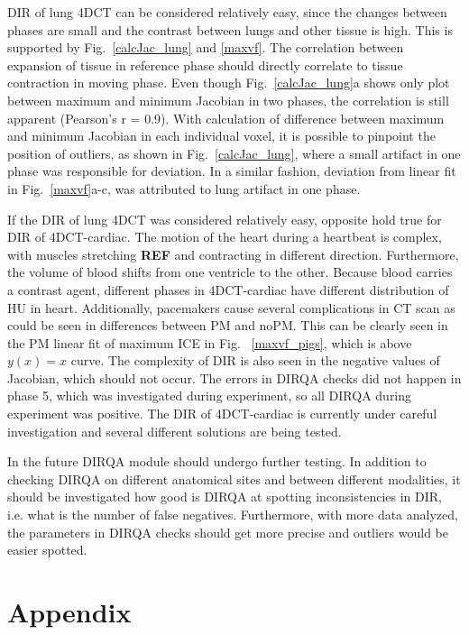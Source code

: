 \documentclass[type=dr, dr=rernat, accentcolor=tud7b,colorbacktitle, bigchapter, openright, twoside, 12pt ]{tudthesis}
\begin{document}
DIR of lung 4DCT can be considered relatively easy, since the changes between phases are small and the contrast between lungs and other tissue is high. This is supported by Fig.~\ref{calcJac_lung} and \ref{maxvf}. The correlation between expansion of 
tissue in reference phase should directly correlate to tissue contraction in moving phase. Even though Fig.~\ref{calcJac_lung}a shows only plot between maximum and minimum Jacobian in two phases, the correlation is still apparent (Pearson's r = 0.9). With calculation
of difference between maximum and minimum Jacobian in each individual voxel, it is possible to pinpoint the position of outliers, as shown in Fig.~\ref{calcJac_lung}, where a small artifact in one phase was responsible for deviation. In a similar fashion,
deviation from linear fit in Fig.~\ref{maxvf}a-c, was attributed to lung artifact in one phase.

If the DIR of lung 4DCT was considered relatively easy, opposite hold true for DIR of 4DCT-cardiac. The motion of the heart during a heartbeat is complex, with muscles stretching \textbf{REF} and contracting in different direction. Furthermore,
the volume of blood shifts from one ventricle to the other. Because blood carries a contrast agent, different phases in 4DCT-cardiac have different distribution of HU in heart. Additionally, pacemakers cause several complications in CT scan \cite{Mak2012} as could be seen in differences between
PM and noPM. This can be clearly seen in the PM linear fit of maximum ICE in Fig.~ \ref{maxvf_pigs}, which is above $y(x) = x$ curve. The complexity of DIR is also seen in the negative values of Jacobian, which should not occur. The errors in DIRQA checks did not happen in phase 5, which was investigated 
during experiment, so all DIRQA during experiment was positive. The DIR of 4DCT-cardiac is currently under careful investigation and several different solutions are being tested.

In the future DIRQA module should undergo further testing. In addition to checking DIRQA on different anatomical sites and between different modalities, it should be investigated how good is DIRQA at spotting inconsistencies in DIR, i.e. what is the number of false negatives. Furthermore, with more
data analyzed, the parameters in DIRQA checks should get more precise and outliers would be easier spotted.


\section{Appendix}
\label{RegHierarchy}



{}
% 
\end{document}
